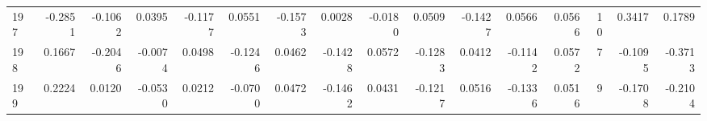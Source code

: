 \begin{tabular}{lrrrrrrrrrrrrrrr}
197 &     -0.2851 & -0.1062 &  0.0395 & -0.1177 &  0.0551 & -0.1573 &  0.0028 & -0.0180 &  0.0509 & -0.1427 &   0.0566 &     0.0566 &     10 &                    0.3417 &                     0.1789 \\
198 &      0.1667 & -0.2046 & -0.0074 &  0.0498 & -0.1246 &  0.0462 & -0.1428 &  0.0572 & -0.1283 &  0.0412 &  -0.1142 &     0.0572 &      7 &                   -0.1095 &                    -0.3713 \\
199 &      0.2224 &  0.0120 & -0.0530 &  0.0212 & -0.0700 &  0.0472 & -0.1462 &  0.0431 & -0.1217 &  0.0516 &  -0.1336 &     0.0516 &      9 &                   -0.1708 &                    -0.2104 \\
\bottomrule
\end{tabular}
